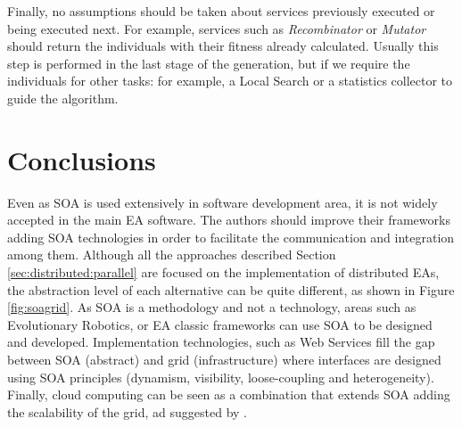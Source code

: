 Finally, no assumptions should be taken about services previously
executed or being executed next. For example, services such as {\em
  Recombinator} or {\em Mutator} should return the individuals with
their fitness already calculated. %
Usually this step is performed in
the last stage of the generation, but if we require the individuals
for other tasks: for example, a Local Search or a statistics collector
to guide the algorithm. %

\section{Conclusions}

Even as SOA is used extensively in software development area, it is
not widely accepted in the main EA software. %
The authors should improve their frameworks adding SOA technologies in
order to facilitate the communication and integration among them. %
 Although all the approaches described Section \ref{sec:distributed:parallel} are focused
 on the implementation of distributed EAs, the abstraction level of
 each alternative can be quite different, as shown in Figure
 \ref{fig:soagrid}.  As SOA is a methodology and not a technology,
 areas such as Evolutionary Robotics, or EA classic frameworks can use
 SOA to be designed and developed. Implementation technologies, such
 as Web Services fill the gap between SOA (abstract) and grid
 (infrastructure) where interfaces are designed using SOA principles
 (dynamism, visibility, loose-coupling and heterogeneity). Finally,
 cloud computing can be seen as a combination that extends SOA adding
 the scalability of the grid, ad suggested by 
 \cite{SOALIB}. %


